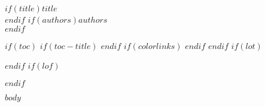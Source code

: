 \documentclass[
$if(fontsize)$
  $fontsize$,
$endif$
$if(lang)$
  $babel-lang$,
$endif$
$if(papersize)$
  $papersize$paper,
$endif$
$if(handout)$
  handout,
$endif$
$if(aspectratio)$
  aspectratio=$aspectratio$,
$endif$
$for(classoption)$
  $classoption$$sep$,
$endfor$
]{$documentclass$}
\begin{document}
\begin{center}
  \hfill \break%
  $if(title)$\Huge{$title$}\\[0.5em]$endif$
  $if(authors)$\Large{$authors$}\\[2.5em]$endif$
\end{center}

$if(toc)$
	$if(toc-title)$
		\renewcommand*\contentsname{$toc-title$}
	$endif$
	$if(colorlinks)$
		\hypersetup{linkcolor=$if(toccolor)$$toccolor$$else$$endif$}
	$endif$
	\setcounter{tocdepth}{$toc-depth$}
	\tableofcontents
$endif$
$if(lot)$
	\listoftables
$endif$
$if(lof)$
	\listoffigures
$endif$

$body$
\end{document}
